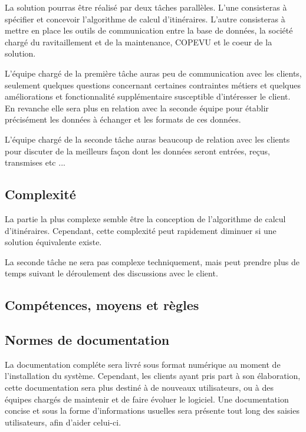         La solution pourras être réalisé par deux tâches parallèles.
        L'une consisteras à spécifier et concevoir l'algorithme de calcul d'itinéraires.
        L'autre consisteras à mettre en place les outils de communication entre la base de données, la société chargé du ravitaillement et de la maintenance, COPEVU et le coeur de la solution.
        
        L'équipe chargé de la première tâche auras peu de communication avec les clients, seulement quelques questions concernant certaines contraintes métiers et quelques améliorations et fonctionnalité supplémentaire susceptible d'intéresser le client.
        En revanche elle sera plus en relation avec la seconde équipe pour établir précisément les données à échanger et les formats de ces données.
        
        L'équipe chargé de la seconde tâche auras beaucoup de relation avec les clients pour discuter de la meilleurs façon dont les données seront entrées, reçus, transmises etc ...
    
    \subsection{Complexité}
    
        La partie la plus complexe semble être la conception de l'algorithme de calcul d'itinéraires.
        Cependant, cette complexité peut rapidement diminuer si une solution équivalente existe.
        
        La seconde tâche ne sera pas complexe techniquement, mais peut prendre plus de temps suivant le déroulement des discussions avec le client.
    
    \subsection{Compétences, moyens et règles}
    
    
    \subsection{Normes de documentation}

        La documentation compléte sera livré sous format numérique au moment de l'installation du système. 
        Cependant, les clients ayant pris part à son élaboration, cette documentation sera plus destiné à de nouveaux utilisateurs, ou à des équipes chargés de maintenir et de faire évoluer le logiciel.
        Une documentation concise et sous la forme d'informations usuelles sera présente tout long des saisies utilisateurs, afin d'aider celui-ci.

